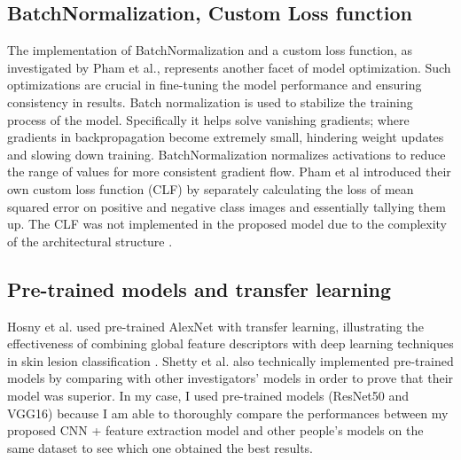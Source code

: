 \documentclass[10pt,twocolumn]{article}
\begin{document}
\subsection{BatchNormalization, Custom Loss function}
The implementation of BatchNormalization and a custom loss function, as investigated by Pham et al., represents another facet of model optimization. Such optimizations are crucial in fine-tuning the model performance and ensuring consistency in results. Batch normalization is used to stabilize the training process of the model. Specifically it helps solve vanishing gradients; where gradients in backpropagation become extremely small, hindering weight updates and slowing down training. BatchNormalization normalizes activations to reduce the range of values for more consistent gradient flow. Pham et al introduced their own custom loss function (CLF) by separately calculating the loss of mean squared error on positive and negative class images and essentially tallying them up. The CLF was not implemented in the proposed model due to the complexity of the architectural structure \cite{pham2021ai}. 

\subsection{Pre-trained models and transfer learning}
Hosny et al. used pre-trained AlexNet with transfer learning, illustrating the effectiveness of combining global feature descriptors with deep learning techniques in skin lesion classification \cite{shetty2022skin}. Shetty et al. also technically implemented pre-trained models by comparing with other investigators’ models in order to prove that their model was superior. In my case, I used pre-trained models (ResNet50 and VGG16) because I am able to thoroughly compare the performances between my proposed CNN + feature extraction model and other people’s models on the same dataset to see which one obtained the best results.
\end{document}
